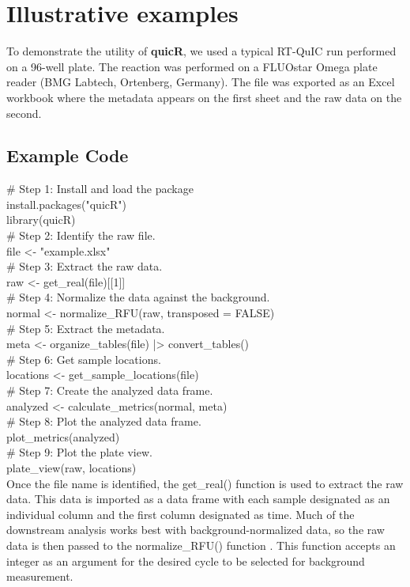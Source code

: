 \documentclass[preprint,12pt,a4paper]{elsarticle}
\begin{document}
    \section{Illustrative examples}
        To demonstrate the utility of \textbf{quicR}, we used a typical RT-QuIC run performed on a 96-well plate. The reaction was performed on a FLUOstar Omega plate reader (BMG Labtech, Ortenberg, Germany). The file was exported as an Excel workbook where the metadata appears on the first sheet and the raw data on the second.
        
        \subsection{Example Code}
            \# Step 1: Install and load the package\\
            install.packages("quicR")\\
            library(quicR)\\
            \# Step 2: Identify the raw file.\\
            file <- "example.xlsx"\\
            \# Step 3: Extract the raw data.\\
            raw <- get\_real(file)[[1]]\\
            \# Step 4: Normalize the data against the background.\\
            normal <- normalize\_RFU(raw, transposed = FALSE)\\
            \# Step 5: Extract the metadata.\\
            meta <- organize\_tables(file) |> convert\_tables()\\
            \# Step 6: Get sample locations.\\
            locations <- get\_sample\_locations(file)\\
            \# Step 7: Create the analyzed data frame.\\
            analyzed <- calculate\_metrics(normal, meta)\\
            \# Step 8: Plot the analyzed data frame.\\
            plot\_metrics(analyzed)\\
            \# Step 9: Plot the plate view.\\
            plate\_view(raw, locations)\\

            Once the file name is identified, the get\_real() function is used to extract the raw data. This data is imported as a data frame with each sample designated as an individual column and the first column designated as time. Much of the downstream analysis works best with background-normalized data, so the raw data is then passed to the normalize\_RFU() function \cite{Rowden2023}. This function accepts an integer as an argument for the desired cycle to be selected for background measurement. 
            
\end{document}
